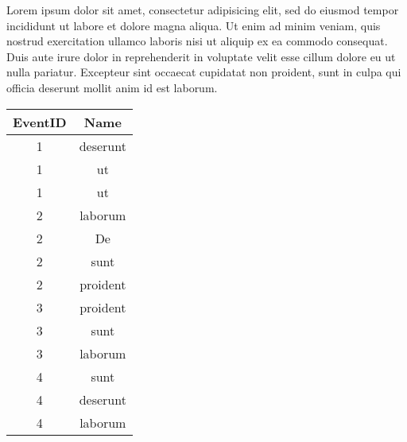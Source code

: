 

Lorem ipsum dolor sit amet, consectetur adipisicing elit, sed do eiusmod tempor incididunt ut labore et dolore magna aliqua. Ut enim ad minim veniam, quis nostrud exercitation ullamco laboris nisi ut aliquip ex ea commodo consequat. Duis aute irure dolor in reprehenderit in voluptate velit esse cillum dolore eu ut nulla pariatur. Excepteur sint occaecat cupidatat non proident, sunt in culpa qui officia deserunt mollit anim id est laborum.

\begin{center}
\vspace{5mm}
\begin{tabular}{c|c}
EventID           &         Name \\ \hline
1                 &         deserunt \\
1                 &         ut \\
1                 &         ut \\ \hline
2                 &         laborum \\
2                 &         De \\
2                 &         sunt \\
2                 &         proident \\ \hline
3                 &         proident \\
3                 &         sunt \\
3                 &         laborum \\ \hline
4                 &         sunt \\
4                 &         deserunt \\
4                 &         laborum
\end{tabular}
\vspace{5mm}
\end{center}

